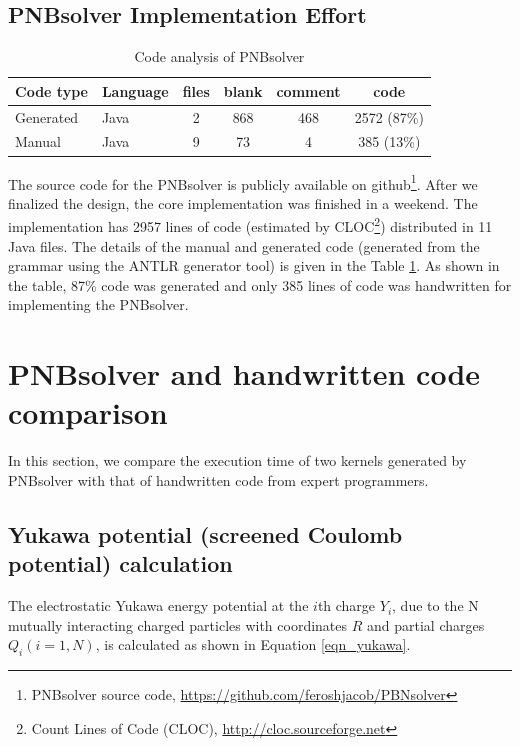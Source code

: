 \documentclass[draftclsnofoot]{elsarticle}
\begin{document}
\subsection{PNBsolver Implementation Effort}

\begin{table}[h]
\caption{Code analysis of PNBsolver}
\label{code_cloc_analysis}
\centering

\begin{tabular}{|l|l|c|c|c|c|} \hline
Code type & Language &files         & blank        &comment          & code \\\hline
Generated & Java                           &2           & 868 &           468  &         2572 (87\%) \\\hline
Manual &Java &                            9&             73 &             4    &        385 (13\%) \\\hline
\end{tabular}
\end{table}

The source code for the PNBsolver is publicly available on github\footnote{PNBsolver source code, \url{https://github.com/feroshjacob/PBNsolver}}. After we finalized the design, the core implementation was finished in a weekend. 
The implementation has 2957 lines of code (estimated by CLOC\footnote{Count Lines of Code (CLOC), \url{http://cloc.sourceforge.net} }) distributed in 11 Java files. The details of the manual and generated code (generated from the 
grammar using the ANTLR generator tool) is given in the Table \ref{code_cloc_analysis}. As shown in the table, 87\% code was generated and only 385 lines of code was handwritten for implementing the PNBsolver.     




\section{PNBsolver and handwritten code comparison}
\label{sec_cmp}

In this section, we compare the execution time of two kernels generated by PNBsolver with that of handwritten code from expert programmers.  

\subsection {Yukawa potential (screened Coulomb potential) calculation}

The electrostatic Yukawa energy potential at the $i$th charge $Y_i$, due to the N mutually interacting  charged particles 
 with coordinates $R$  and partial charges $Q_i(i=1,N)$, is calculated as shown in Equation \ref{eqn_yukawa}.
\end{document}
